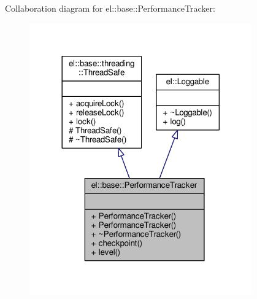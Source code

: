 Collaboration diagram for el\+:\+:base\+:\+:Performance\+Tracker\+:
\nopagebreak
\begin{figure}[H]
\begin{center}
\leavevmode
\includegraphics[width=272pt]{da/d81/classel_1_1base_1_1PerformanceTracker__coll__graph}
\end{center}
\end{figure}
